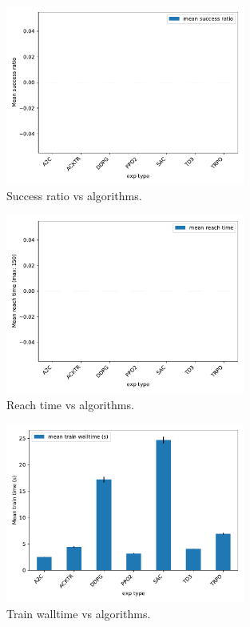 \documentclass{article}
\begin{document}
\begin{figure}[H]
    \centering
    \includegraphics[width=0.7\textwidth]{../success_by_exp_type.pdf}
\caption{Success ratio vs algorithms.}
\end{figure}


\begin{figure}[H]
    \centering
    \includegraphics[width=0.7\textwidth]{../reachtime_by_exp_type.pdf}
\caption{Reach time vs algorithms.}
\end{figure}



\begin{figure}[H]
    \centering
    \includegraphics[width=0.7\textwidth]{../walltime_by_exp_type.pdf}
\caption{Train walltime vs algorithms.}
\end{figure}
\end{document}
